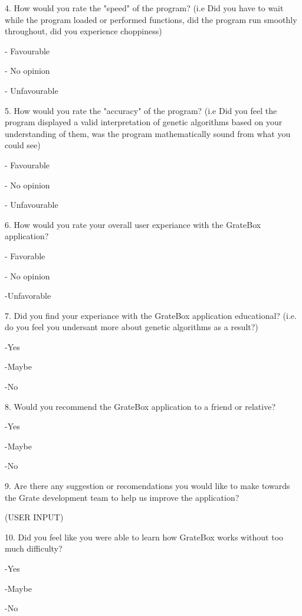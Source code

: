 \documentclass[12pt, titlepage]{article}
\begin{document}
4. How would you rate the "speed" of the program? (i.e Did you have to wait 
while the program loaded or performed functions, did the program run smoothly 
throughout, did you experience choppiness)

- Favourable

- No opinion

- Unfavourable

5. How would you rate the "accuracy" of the program? (i.e Did you feel the 
program displayed a valid interpretation of genetic algorithms based on your 
understanding of them, was the program mathematically sound from what you could 
see)

- Favourable

- No opinion

- Unfavourable

6. How would you rate your overall user experiance with the GrateBox
application?

- Favorable

- No opinion

-Unfavorable

7. Did you find your experiance with the GrateBox application educational? 
(i.e. do you feel you undersant more about genetic algorithms as a result?)

-Yes

-Maybe

-No

8. Would you recommend the GrateBox application to a friend or relative?

-Yes

-Maybe

-No

9. Are there any suggestion or recomendations you would like to make towards the 
Grate development team to help us improve the application?

(USER INPUT)

\textcolor{RoyalPurple}{10. Did you feel like you were able to learn how GrateBox works 
without too much difficulty?}

\textcolor{RoyalPurple}{-Yes}

\textcolor{RoyalPurple}{-Maybe}

\textcolor{RoyalPurple}{-No}
\end{document}
